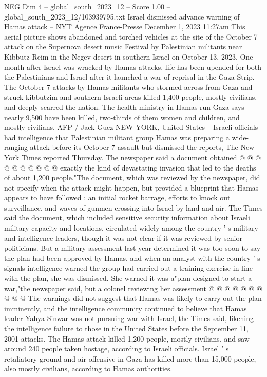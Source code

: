 \begin{textsample}{NEG Dim 4 – global\_south\_2023\_12 – Score 1.00 – global\_south\_2023\_12/103939795.txt}  \label{ex:f4_neg_314}
Israel dismissed advance warning of Hamas attack -- NYT Agence France-Presse December 1, 2023 11:27am This aerial picture shows abandoned and torched vehicles at the site of the October 7 attack on the Supernova desert music Festival by Palestinian militants near Kibbutz Reim in the Negev desert in southern Israel on October 13, 2023.
One month after Israel was wracked by Hamas attacks, life has been upended for both the Palestinians and Israel after it launched a war of reprisal in the Gaza Strip.
The October 7 attacks by Hamas militants who stormed across from Gaza and struck kibbutzim and southern Israeli areas killed 1,400 people, mostly civilians, and deeply scarred the nation.
The health ministry in Hamas-run Gaza says nearly 9,500 have been killed, two-thirds of them women and children, and mostly civilians.
AFP / Jack Guez NEW YORK, United States -- Israeli officials had intelligence that Palestinian militant group Hamas was preparing a wide-ranging attack before its October 7 assault but dismissed the reports, The New York Times reported Thursday.
The newspaper said a document obtained @ @ @ @ @ @ @ @ @ @ exactly the kind of devastating invasion that led to the deaths of about 1,200 people."The document, which was reviewed by the newspaper, did not specify when the attack might happen, but provided a blueprint that Hamas appears to have followed : an initial rocket barrage, efforts to knock out surveillance, and waves of gunmen crossing into Israel by land and air.
The Times said the document, which included sensitive security information about Israeli military capacity and locations, circulated widely among the country ' s military and intelligence leaders, though it was not clear if it was reviewed by senior politicians.
But a military assessment last year determined it was too soon to say the plan had been approved by Hamas, and when an analyst with the country ' s signals intelligence warned the group had carried out a training exercise in line with the plan, she was dismissed.
She warned it was a"plan designed to start a war,"the newspaper said, but a colonel reviewing her assessment @ @ @ @ @ @ @ @ @ @ The warnings did not suggest that Hamas was likely to carry out the plan imminently, and the intelligence community continued to believe that Hamas leader Yahya Sinwar was not pursuing war with Israel, the Times said, likening the intelligence failure to those in the United States before the September 11, 2001 attacks.
The Hamas attack killed 1,200 people, mostly civilians, and saw around 240 people taken hostage, according to Israeli officials.
Israel ' s retaliatory ground and air offensive in Gaza has killed more than 15,000 people, also mostly civilians, according to Hamas authorities.

\end{textsample}
